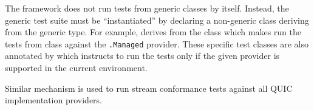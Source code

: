 The \xUnit{} framework does not run tests from generic classes by itself. Instead, the generic test
suite must be ``instantiated'' by declaring a non-generic class deriving from the generic type. For
example,  derives from the
 class which makes
\xUnit{} run the tests from \QuicStreamTests{} class against the
\texttt{\QuicImplementationProviders{}.Managed} provider. These specific test classes are also
annotated by  which instructs \xUnit{} to run the tests only if the
given provider is supported in the current environment.

Similar mechanism is used to run stream conformance tests against all QUIC implementation providers.
